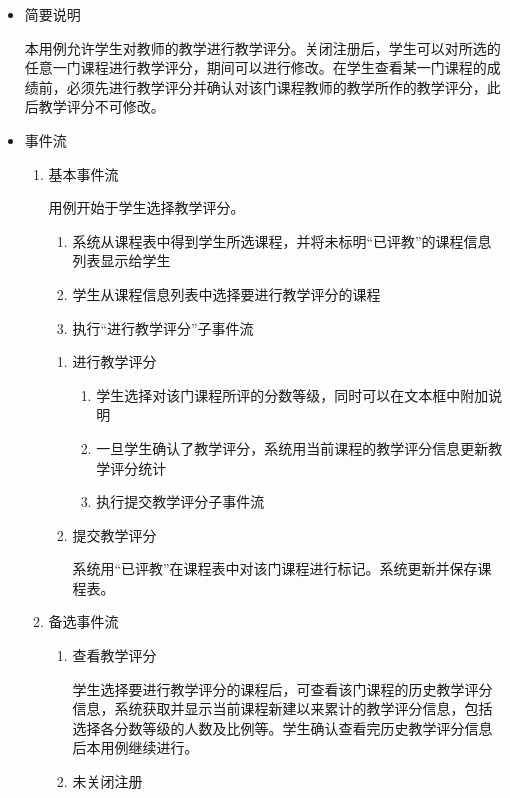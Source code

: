 \begin{itemize}
  \item 简要说明
  
  \CJKindent 本用例允许学生对教师的教学进行教学评分。关闭注册后，学生可以对所选的任意一门课程进行教学评分，期间可以进行修改。在学生查看某一门课程的成绩前，必须先进行教学评分并确认对该门课程教师的教学所作的教学评分，此后教学评分不可修改。
  
  \item 事件流
  
  \begin{enumerate}
    \item 基本事件流
    
    \CJKindent 用例开始于学生选择教学评分。
    \begin{enumerate}
      \item 系统从课程表中得到学生所选课程，并将未标明“已评教”的课程信息列表显示给学生
      \item 学生从课程信息列表中选择要进行教学评分的课程
      \item 执行“进行教学评分”子事件流
    \end{enumerate}
    
    \begin{enumerate}[{1}.1]
      \item 进行教学评分
      \begin{enumerate}[(1)]
        \item 学生选择对该门课程所评的分数等级，同时可以在文本框中附加说明
        \item 一旦学生确认了教学评分，系统用当前课程的教学评分信息更新教学评分统计
        \item 执行提交教学评分子事件流
      \end{enumerate}
      
      \item 提交教学评分
      
      \CJKindent 系统用“已评教”在课程表中对该门课程进行标记。系统更新并保存课程表。
    \end{enumerate}
    
    \item 备选事件流
    \begin{enumerate}[{2}.1]
      \item 查看教学评分
      
      \CJKindent 学生选择要进行教学评分的课程后，可查看该门课程的历史教学评分信息，系统获取并显示当前课程新建以来累计的教学评分信息，包括选择各分数等级的人数及比例等。学生确认查看完历史教学评分信息后本用例继续进行。
      \item 未关闭注册
      

\end{enumerate}
\end{enumerate}
\end{itemize}
